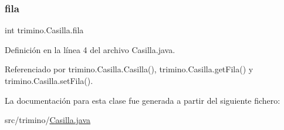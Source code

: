 \subsubsection{\texorpdfstring{fila}{fila}}
{\footnotesize\ttfamily int trimino.\+Casilla.\+fila\hspace{0.3cm}{\ttfamily [private]}}



Definición en la línea 4 del archivo Casilla.\+java.



Referenciado por trimino.\+Casilla.\+Casilla(), trimino.\+Casilla.\+get\+Fila() y trimino.\+Casilla.\+set\+Fila().



La documentación para esta clase fue generada a partir del siguiente fichero\+:\begin{DoxyCompactItemize}
\item 
src/trimino/\mbox{\hyperlink{Casilla_8java}{Casilla.\+java}}\end{DoxyCompactItemize}
